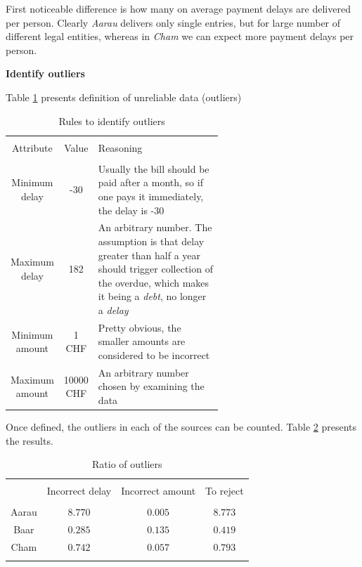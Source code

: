 \documentclass{article}
\begin{document}
First noticeable difference is how many on average payment delays are delivered per person. Clearly \textit{Aarau} delivers only single entries, but for large number of different legal entities, whereas in \textit{Cham} we can expect more payment delays per person.\par

\vspace{10pt}

\textbf{Identify outliers}\par

Table \ref{tab:outlier-def} presents definition of unreliable data (outliers)

\begin{table}[!htbp]
    \centering
    \caption{Rules to identify outliers}
    \label{tab:outlier-def}
    \begin{tabular}{c c p{0.6\linewidth}}
    \hline\hline \\
    Attribute & Value & Reasoning \\
    \hline \\
    Minimum delay & -30 & Usually the bill should be paid after a month, so if one pays it immediately, the delay is -30 \\
    Maximum delay & 182 & An arbitrary number. The assumption is that delay greater than half a year should trigger collection of the overdue, which makes it being a \textit{debt}, no longer a \textit{delay} \\
    Minimum amount & 1 CHF & Pretty obvious, the smaller amounts are considered to be incorrect \\
    Maximum amount & 10000 CHF & An arbitrary number chosen by examining the data \\
    \end{tabular}
\end{table}

Once defined, the outliers in each of the sources can be counted. Table \ref{tab:outliers-ratio} presents the results.\par

\begin{table}[hbt!] \centering
  \caption{Ratio of outliers}
  \label{tab:outliers-ratio}
\begin{tabular}{@{\extracolsep{5pt}} cccc}
\\[-1.8ex]\hline
\hline \\[-1.8ex]
 & Incorrect delay & Incorrect amount & To reject \\
\hline \\[-1.8ex]
Aarau & $8.770$ & $0.005$ & $8.773$ \\
Baar & $0.285$ & $0.135$ & $0.419$ \\
Cham & $0.742$ & $0.057$ & $0.793$ \\
\hline \\[-1.8ex]
\end{tabular}
\end{table}
\end{document}
